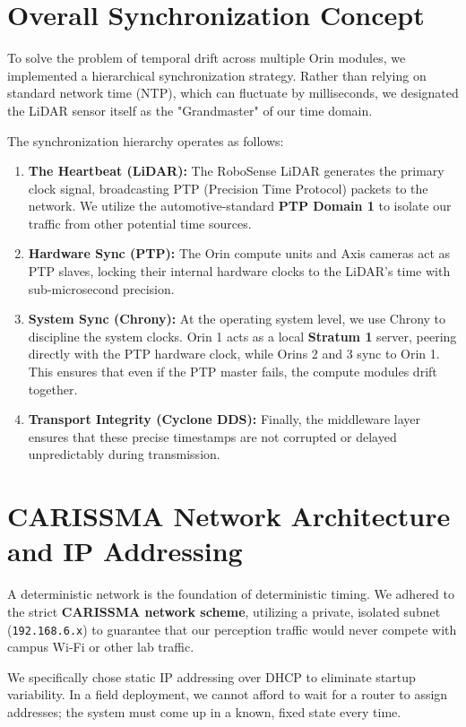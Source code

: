 \documentclass[12pt,a4paper]{report}
\begin{document}
{\section{Overall Synchronization Concept}
To solve the problem of temporal drift across multiple Orin modules, we implemented a hierarchical synchronization strategy. Rather than relying on standard network time (NTP), which can fluctuate by milliseconds, we designated the LiDAR sensor itself as the "Grandmaster" of our time domain.

The synchronization hierarchy operates as follows:
\begin{enumerate}
  \item  \textbf{The Heartbeat (LiDAR):} The RoboSense LiDAR generates the primary clock signal, broadcasting PTP (Precision Time Protocol) packets to the network. We utilize the automotive-standard \textbf{PTP Domain 1} to isolate our traffic from other potential time sources.
  \item  \textbf{Hardware Sync (PTP):} The Orin compute units and Axis cameras act as PTP slaves, locking their internal hardware clocks to the LiDAR's time with sub-microsecond precision.
  \item  \textbf{System Sync (Chrony):} At the operating system level, we use Chrony to discipline the system clocks. Orin 1 acts as a local \textbf{Stratum 1} server, peering directly with the PTP hardware clock, while Orins 2 and 3 sync to Orin 1. This ensures that even if the PTP master fails, the compute modules drift together.
  \item  \textbf{Transport Integrity (Cyclone DDS):} Finally, the middleware layer ensures that these precise timestamps are not corrupted or delayed unpredictably during transmission.
\end{enumerate}

\section{CARISSMA Network Architecture and IP Addressing}
A deterministic network is the foundation of deterministic timing. We adhered to the strict \textbf{CARISSMA network scheme}, utilizing a private, isolated subnet (\texttt{192.168.6.x}) to guarantee that our perception traffic would never compete with campus Wi-Fi or other lab traffic.

We specifically chose static IP addressing over DHCP to eliminate startup variability. In a field deployment, we cannot afford to wait for a router to assign addresses; the system must come up in a known, fixed state every time.

}
\end{document}
